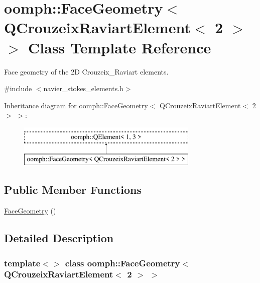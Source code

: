 \hypertarget{classoomph_1_1FaceGeometry_3_01QCrouzeixRaviartElement_3_012_01_4_01_4}{}\section{oomph\+:\+:Face\+Geometry$<$ Q\+Crouzeix\+Raviart\+Element$<$ 2 $>$ $>$ Class Template Reference}
\label{classoomph_1_1FaceGeometry_3_01QCrouzeixRaviartElement_3_012_01_4_01_4}


Face geometry of the 2D Crouzeix\+\_\+\+Raviart elements.  




{\ttfamily \#include $<$navier\+\_\+stokes\+\_\+elements.\+h$>$}

Inheritance diagram for oomph\+:\+:Face\+Geometry$<$ Q\+Crouzeix\+Raviart\+Element$<$ 2 $>$ $>$\+:\begin{figure}[H]
\begin{center}
\leavevmode
\includegraphics[height=2.000000cm]{classoomph_1_1FaceGeometry_3_01QCrouzeixRaviartElement_3_012_01_4_01_4}
\end{center}
\end{figure}
\subsection*{Public Member Functions}
\begin{DoxyCompactItemize}
\item 
\hyperlink{classoomph_1_1FaceGeometry_3_01QCrouzeixRaviartElement_3_012_01_4_01_4_ad1273faf77f63f9b5e987ccb7620b0d1}{Face\+Geometry} ()
\end{DoxyCompactItemize}


\subsection{Detailed Description}
\subsubsection*{template$<$$>$\newline
class oomph\+::\+Face\+Geometry$<$ Q\+Crouzeix\+Raviart\+Element$<$ 2 $>$ $>$}

